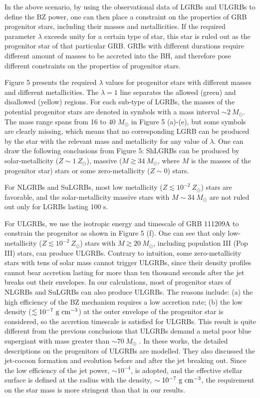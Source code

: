 \documentclass[twocolumn]{aastex6}
\begin{document}
In the above scenario, by using the observational data of LGRBs and ULGRBs to define the BZ power, one can then place a constraint on the properties of GRB progenitor stars, including their masses and metallicities. If the required parameter $\lambda$ exceeds unity for a certain type of star, this star is ruled out as the progenitor star of that particular GRB. GRBs with different durations require different amount of masses to be accreted into the BH, and therefore pose different constraints on the properties of progenitor stars.

Figure 5 presents the required $\lambda$ values for progenitor stars with different masses and different metallicities. The $\lambda=1$ line separates the allowed (green) and disallowed (yellow) regions. For each sub-type of LGRBs, the masses of the potential progenitor stars are denoted in symbols with a mass interval $\sim 2~M_\odot$. The mass range spans from 16 to 40 $M_\odot$ in Figure 5 (a)-(e), but some symbols are clearly missing, which means that no corresponding LGRB can be produced by the star with the relevant mass and metallicity for any value of $\lambda$. One can draw the following conclusions from Figure 5: ShLGRBs can be produced by solar-metallicity ($Z \sim 1~ Z_\odot$), massive ($M \gtrsim 34 ~M_\odot$, where $M$ is the masses of the progenitor star) stars or some zero-metallicity ($Z \sim 0$) stars.

For NLGRBs and SuLGRBs, most low metallicity ($Z \lesssim 10^{-2}~ Z_\odot$) stars are favorable, and the solar-metallicity massive stars with $M \sim 34 ~M_\odot$ are not ruled out only for LGRBs lasting 100 s.

For ULGRBs, we use the isotropic energy and timescale of GRB 111209A to constrain the progenitor as shown in Figure 5 (f). One can see that only low-metallicity ($Z \lesssim 10^{-2}~Z_\odot$) stars with $M \gtrsim 20 ~M_\odot$, including population III (Pop III) stars, can produce ULGRBs. Contrary to intuition, some zero-metallicity stars with tens of solar mass cannot trigger ULGRBs, since their density profiles cannot bear accretion lasting for more than ten thousand seconds after the jet breaks out their envelopes. In our calculations, most of progenitor stars of NLGRBs and SuLGRBs can also produce ULGRBs. The reasons include: (a) the high efficiency of the BZ mechanism requires a low accretion rate; (b) the low density ($\lesssim 10^{-7} ~\rm g~cm^{-3}$) at the outer envelope of the progenitor star is considered, so the accretion timescale is satisfied for ULGRBs. This result is quite different from the previous conclusions that ULGRBs demand a metal poor blue supergiant with mass greater than $\sim 70~M_\odot$ \citep[e.g.,][]{Nakauchi2013,Kashiyama2013}. In these works, the detailed descriptions on the progenitors of ULGRBs are modelled. They also discussed the jet-cocoon formation and evolution before and after the jet breaking out. Since the low efficiency of the jet power, $\sim 10^{-4}$, is adopted, and the effective stellar surface is defined at the radius with the density, $\sim 10^{-7} ~\rm g~cm^{-3}$, the requirement on the star mass is more stringent than that in our results.
\end{document}
